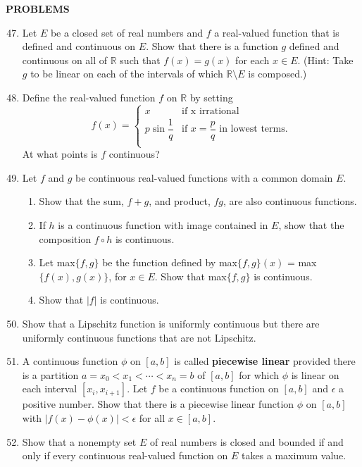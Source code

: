 \documentclass[a4paper,10pt]{book}
\theoremstyle{plain} %
\begin{document}
\begin{center}
	\textbf{PROBLEMS}
\end{center}
\begin{enumerate}
	\setcounter{enumi}{46}
	\item Let $E$ be a closed set of real numbers and $f$ a real-valued function that is defined and continuous on $E$. Show that there is a function $g$ defined and continuous on all of $\mathbb{R}$ such that $f(x) = g(x)$ for each $x \in E$. (Hint: Take $g$ to be linear on each of the intervals of which $\mathbb{R} \setminus E$ is composed.)
	\item Define the real-valued function $f$ on $\mathbb{R}$ by setting 
	\[ 
	f(x) =
	\begin{cases} 
		x & \text{if x irrational}\\
		p \sin \dfrac{1}{q} & \text{if } x = \dfrac{p}{q} \text{ in lowest terms.} \\
	\end{cases}
	\]
	At what points is $f$ continuous?
	\item Let $f$ and $g$ be continuous real-valued functions with a common domain $E$.
	\begin{enumerate}[label=(\roman*),align=left]
        \item Show that the sum, $f+g$, and product, $fg$, are also continuous functions.
        \item If $h$ is a continuous function with image contained in $E$, show that the composition $f \circ h$ is continuous.
        \item Let max$\{f,g\}$ be the function defined by max$\{f,g\}(x)$ = max$\{f(x),g(x)\}$, for $x \in E$. Show that max$\{f,g\}$ is continuous.
        \item Show that $|f|$ is continuous.
    \end{enumerate}
	\item Show that a Lipschitz function is uniformly continuous but there are uniformly continuous functions that are not Lipschitz.
	\item A continuous function $\phi$ on $[a,b]$ is called \textbf{piecewise linear} provided there is a partition $a=x_0<x_1< \cdots <x_n = b$ of $[a,b]$ for which $\phi$ is linear on each interval $[x_i, x_{i+1}]$. Let $f$ be a continuous function on $[a,b]$ and $\epsilon$ a positive number. 
	Show that there is a piecewise linear function $\phi$ on $[a,b]$ with $|f(x)-\phi (x)| < \epsilon$ for all $x \in [a,b]$.
	\item Show that a nonempty set $E$ of real numbers is closed and bounded if and only if every continuous real-valued function on $E$ takes a maximum value.

\end{enumerate}
\end{document}
